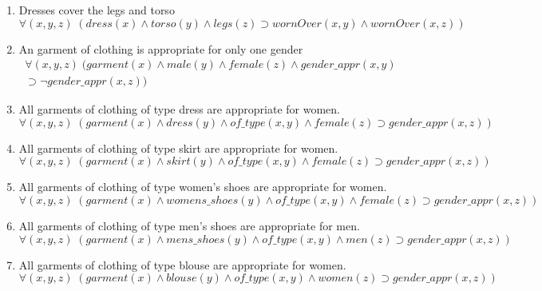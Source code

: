 \documentclass[paper=a4, fontsize=11pt]{scrartcl} %
\numberwithin{equation}{section} %
\numberwithin{figure}{section} %
\numberwithin{table}{section} %
\begin{document}
\begin{enumerate}
\item Dresses cover the legs and torso
\begin{equation*}
	\forall(x,y,z) \; (dress(x) \land torso(y) \land legs(z) \supset wornOver(x,y) \land wornOver(x,z))
\end{equation*}

\item An garment of clothing is appropriate for only one gender
\begin{equation*}
	\begin{split}
	\forall(x,y,z) \; (garment(x) \land male(y) \land female(z) \land gender\_appr(x,y) \\ \supset \lnot gender\_appr(x,z))
	\end{split}
\end{equation*}

\item All garments of clothing of type dress are appropriate for women.
\begin{equation*}
	\forall(x,y,z) \; (garment(x) \land dress(y) \land of\_type(x,y) \land female(z) \supset gender\_appr(x,z)) 
\end{equation*}

\item All garments of clothing of type skirt are appropriate for women.
\begin{equation*}
	\forall(x,y,z) \; (garment(x) \land skirt(y) \land of\_type(x,y) \land female(z) \supset gender\_appr(x,z)) 
\end{equation*}

\item All garments of clothing of type women's shoes are appropriate for women.
\begin{equation*}
	\forall(x,y,z) \; (garment(x) \land womens\_shoes(y) \land of\_type(x,y) \land female(z) \supset gender\_appr(x,z)) 
\end{equation*}

\item All garments of clothing of type men's shoes are appropriate for men.
\begin{equation*}
	\forall(x,y,z) \; (garment(x) \land mens\_shoes(y) \land of\_type(x,y) \land men(z) \supset gender\_appr(x,z)) 
\end{equation*}

\item All garments of clothing of type blouse are appropriate for women.
\begin{equation*}
	\forall(x,y,z) \; (garment(x) \land blouse(y) \land of\_type(x,y) \land women(z) \supset gender\_appr(x,z)) 
\end{equation*}


\end{enumerate}
\end{document}
